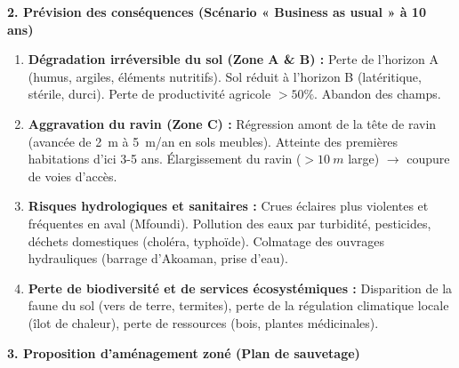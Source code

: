 \documentclass[11pt]{article}
\begin{document}
\begin{exoresolu}
\noindent\textbf{2. Prévision des conséquences (Scénario « Business as usual » à 10 ans)}

\begin{enumerate}
    \item \textbf{Dégradation irréversible du sol (Zone A \& B) :} Perte de l'horizon A (humus, argiles, éléments nutritifs). Sol réduit à l'horizon B (latéritique, stérile, durci). Perte de productivité agricole $> 50\%$. Abandon des champs.
    \item \textbf{Aggravation du ravin (Zone C) :} Régression amont de la tête de ravin (avancée de \SI{2}{m} à \SI{5}{m/an} en sols meubles). Atteinte des premières habitations d'ici 3-5 ans. Élargissement du ravin ($> \SI{10}{m}$ large) $\rightarrow$ coupure de voies d'accès.
    \item \textbf{Risques hydrologiques et sanitaires :} Crues éclaires plus violentes et fréquentes en aval (Mfoundi). Pollution des eaux par turbidité, pesticides, déchets domestiques (choléra, typhoïde). Colmatage des ouvrages hydrauliques (barrage d'Akoaman, prise d'eau).
    \item \textbf{Perte de biodiversité et de services écosystémiques :} Disparition de la faune du sol (vers de terre, termites), perte de la régulation climatique locale (îlot de chaleur), perte de ressources (bois, plantes médicinales).
\end{enumerate}

\noindent\textbf{3. Proposition d'aménagement zoné (Plan de sauvetage)}


\end{exoresolu}
\end{document}
